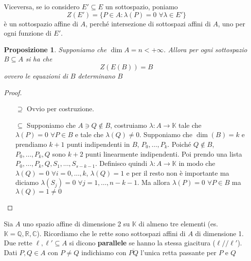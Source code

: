 \documentclass{article}
\newcounter{theo}[section]\setcounter{theo}{0}
\theoremstyle{plain}
\newtheorem{proposition}[theo]{Proposizione}
\theoremstyle{definition}
\theoremstyle{remark}
\begin{document}
Viceversa, se io considero \(E' \subseteq E \) un sottospazio, poniamo
\[
    Z(E') = \{P \in A : \lambda(P) = 0\,\, \forall \lambda \in E'\} 
\]
è un sottospazio affine di \(A\), perché intersezione di sottospazi affini di
\(A\), uno per ogni funzione di \(E'\).
\begin{proposition}
    Supponiamo che \(\dim A = n < + \infty\). Allora per ogni sottospazio \(B
    \subseteq A \) si ha che 
    \[
        Z(E(B)) = B
    \]
    ovvero le equazioni di \(B\) determinano \(B\)
\end{proposition}
\begin{proof}\( \)
\begin{itemize}
    \item[\(\supseteq  \)] Ovvio per costruzione.
    \item[\(\subseteq \)] Supponiamo che \(A \ni Q \not\in B\), costruiamo
        \(\lambda : A \to \mathbb{K}\) tale che \(\lambda(P) = 0\,\, \forall P
        \in B\) e tale che \(\lambda(Q) \neq 0\). Supponiamo che \(\dim(B) = k\)
        e prendiamo \(k+1\) punti indipendenti in \(B\), \(P_{0}, \dots, P_k\).
        Poiché \(Q \not\in B\), \(P_{0}, \dots, P_k, Q\) sono \(k+2\) punti
        linearmente indipendenti. Poi prendo una lista \(P_{0}, \dots, P_k, Q,
        S_{1}, \dots, S_{s-k-1}\). Definisco quindi \(\lambda: A \to
        \mathbb{K}\) in modo che \(\lambda(Q) = 0\,\,\forall i = 0,\dots, k\),
        \(\lambda(Q) = 1\) e per il resto non è importante ma diciamo
        \(\lambda(S_j) = 0\,\,\forall j = 1, \dots, n-k-1\).
        Ma allora \(\lambda(P) = 0\,\,\forall P \in B\) ma \(\lambda(Q) = 1 \neq
        0\) 
\end{itemize}
\end{proof}

Sia \(A\) uno spazio affine di dimensione 2 su \(\mathbb{K}\) di almeno tre
elementi (es.~\(\mathbb{K} = \mathbb{Q}, \mathbb{R}, \mathbb{C}\)). Ricordiamo
che le rette sono sottospazi affini di \(A\) di dimensione 1. Due rette \(\ell,
\ell' \subseteq A \) si dicono \textbf{parallele} se hanno la stessa giacitura
(\(\ell // \ell'\)). Dati \(P, Q \in A\) con \(P \neq Q\) indichiamo con
\(\overline{PQ}\) l'unica retta passante per \(P\) e \(Q\) 
\end{document}

